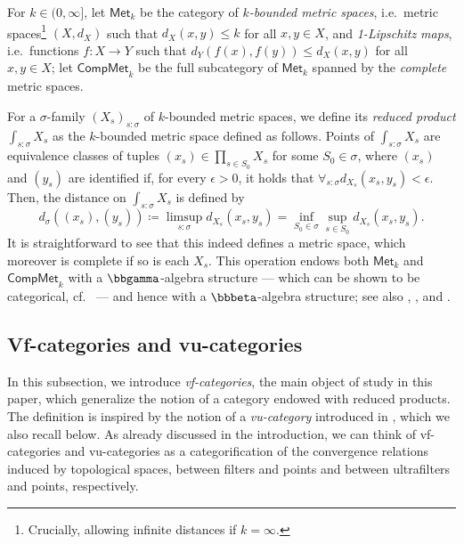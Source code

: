 \begin{ex}\label{ex:metric-spaces}
    For $k \in (0,\infty]$, let $\mathsf{Met}_k$ be the category of \emph{$k$-bounded metric spaces}, i.e.\ metric spaces\footnote{Crucially, allowing infinite distances if $k = \infty$.} $(X,d_X)$ such that $d_X(x,y) \leq k$ for all $x,y\in X$, and \emph{1-Lipschitz maps}, i.e.\ functions $f \colon X \to Y$ such that $d_Y(f(x), f(y)) \leq d_X(x,y)$ for all $x,y\in X$; let $\mathsf{CompMet}_k$ be the full subcategory of $\mathsf{Met}_k$ spanned by the \emph{complete} metric spaces.

    For a $\sigma$-family $(X_s)_{s:\sigma}$ of $k$-bounded metric spaces, we define its \emph{reduced product} $\int_{s:\sigma} X_s$ as the $k$-bounded metric space defined as follows. Points of $\int_{s:\sigma} X_s$ are equivalence classes of tuples $(x_s)\in \prod_{s\in S_0}X_s$ for some $S_0 \in \sigma$, where $(x_s)$ and $(y_s)$ are identified if, for every $\epsilon>0$, it holds that $\forall_{s:\sigma}d_{X_s}(x_s,y_s)<\epsilon$. Then, the distance on $\int_{s:\sigma} X_s$ is defined by
    \[ \textstyle d_\sigma((x_s),(y_s)) \coloneqq \limsup_{s:\sigma} d_{X_s} (x_s,y_s) = \inf_{S_0 \in \sigma} \sup_{s\in S_0} d_{X_s} (x_s,y_s).\]
    It is straightforward to see that this indeed defines a metric space, which moreover is complete if so is each $X_s$. This operation endows both $\mathsf{Met}_k$ and $\mathsf{CompMet}_k$ with a $\bbgamma$-algebra structure --- which can be shown to be categorical, cf.\ \cite[Prop.\ 2.1]{hamadBundlesMetricStructures2026} --- and hence with a $\bbbeta$-algebra structure; see also \cite[Thm.\ 8.2]{hamadUltracategoriesColaxAlgebras2025}, \cite{henryUltracategoriesUltracategoriesMetric2026}, and \cite{yaacovModelTheoryMetric2008,ghasemiReducedProductsMetric2016}. 
\end{ex}

\subsection{Vf-categories and vu-categories}\label{ssec:vf-cats-vu-cats}In this subsection, we introduce \emph{vf-categories}, the main object of study in this paper, which generalize the notion of a category endowed with reduced products. The definition is inspired by the notion of a \emph{vu-category} introduced in \cite{saadiaExtendingConceptualCompleteness2026,hamadGeneralisedUltracategoriesConceptual2025,vangoolToposesEnoughPoints2026}, which we also recall below. As already discussed in the introduction, we can think of vf-categories and vu-categories as a categorification of the convergence relations induced by topological spaces, between filters and points and between ultrafilters and points, respectively. 




